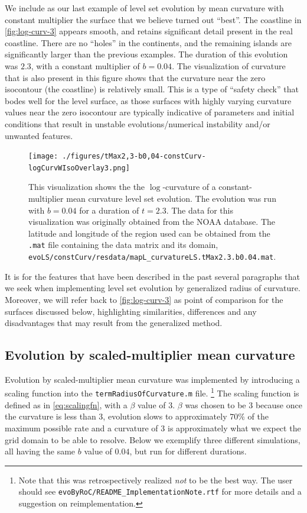 \documentclass{article}
\begin{document}
We include as our last example of level set evolution by mean
curvature with constant multiplier the surface that we believe
turned out ``best''. The coastline in \autoref{fig:log-curv-3}
appears smooth, and retains significant detail present in the real
coastline. There are no ``holes'' in the continents, and the
remaining islands are significantly larger than the previous
examples. The duration of this evolution was $2.3$, with a
constant multiplier of $b = 0.04$. The visualization of curvature
that is also present in this figure shows that the curvature near
the zero isocontour (the coastline) is relatively small. This is a
type of ``safety check'' that bodes well for the level surface, as
those surfaces with highly varying curvature values near the zero
isocontour are typically indicative of parameters and initial
conditions that result in unstable evolutions/numerical
instability and/or unwanted features.

\begin{figure}[h]
  \centering
  \texttt{[image: ./figures/tMax2,3-b0,04-constCurv-logCurvWIsoOverlay3.png]}
  \caption{This visualization shows the the $\log$-curvature of a
constant-multiplier mean curvature level set evolution. The
evolution was run with $b = 0.04$ for a duration of $t = 2.3$. The data
for this visualization was originally obtained from the NOAA
database. The latitude and longitude of the region used can be
obtained from the \texttt{.mat} file containing the data matrix
and its domain,
\texttt{evoLS/constCurv/resdata/mapL\_curvatureLS.tMax2.3.b0.04.mat}.}
\label{fig:log-curv-3}
\end{figure}

It is for the features that have been described in the past
several paragraphs that we seek when implementing level set
evolution by generalized radius of curvature. Moreover, we will
refer back to \autoref{fig:log-curv-3} as point of comparison for
the surfaces discussed below, highlighting similarities,
differences and any disadvantages that may result from the
generalized method. 

\subsection{Evolution by scaled-multiplier mean curvature}
\label{sec:evol-const-mult}

Evolution by scaled-multiplier mean curvature was implemented by
introducing a scaling function into the
\texttt{termRadiusOfCurvature.m} file.  
\footnote{Note that this was retrospectively realized \emph{not}
  to be the best way. The user should see
  \texttt{evoByRoC/README\_ImplementationNote.rtf} for more
  details and a suggestion on reimplementation.} 
The scaling function is defined as in \autoref{eq:scalingfn}, with
a $\beta$ value of $3$. $\beta$ was chosen to be $3$ because once
the curvature is less than $3$, evolution slows to approximately
$70\%$ of the maximum possible rate and a curvature of $3$ is
approximately what we expect the grid domain to be able to
resolve. Below we exemplify three different simulations, all
having the same $b$ value of $0.04$, but run for different
durations. 
\end{document}
